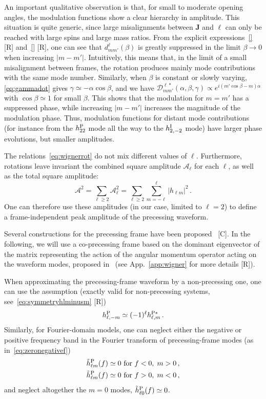 \documentclass[aps,showpacs,twocolumn,
prd,superscriptaddress,nofootinbib]{revtex4-1}
\newcommand{\be}{\begin{equation}}
\newcommand{\ee}{\end{equation}}
\newcommand\calD{{\mathcal{D}}}
\newcommand\calA{{\mathcal{A}}}
\newcommand{\nn}{\nonumber}
\newcommand{\SM}[1]{{\color{Red} #1}}
\begin{document}
An important qualitative observation is that, for small to moderate opening angles, the modulation functions show a clear hierarchy in amplitude. This situation is quite generic, since large misalignments between $\bm{J}$ and $\bm{\ell}$ can only be reached with large spins and large mass ratios. From the explicit expressions~\eqref{} \SM{[R]} and~\eqref{} \SM{[R]}, one can see that $d^{\ell}_{mm'}(\beta)$ is greatly suppressed in the limit $\beta \rightarrow 0$ when increasing $|m-m'|$. Intuitively, this means that, in the limit of a small misalignment between frames, the rotation produces mainly mode contributions with the same mode number. Similarly, when $\beta$ is constant or slowly varying, \eqref{eq:gammadot} gives $\gamma \simeq - \alpha \cos\beta$, and we have $\calD^{\ell *}_{mm'} (\alpha, \beta, \gamma) \propto e^{i(m' \cos\beta - m) \alpha}$ with $\cos\beta \simeq 1$ for small $\beta$. This shows that the modulation for $m=m'$ has a suppressed phase, while increasing $|m-m'|$ increases the magnitude of the modulation phase. Thus, modulation functions for distant mode contributions (for instance from the $h^{\rm P}_{22}$ mode all the way to the $h^{\rm I}_{2,-2}$ mode) have larger phase evolutions, but smaller amplitudes.

The relations~\eqref{eq:wignerrot} do not mix different values of $\ell$. Furthermore, rotations leave invariant the combined square amplitude $\calA_{\ell}$ for each $\ell$, as well as the total square amplitude:
\be
	\calA^{2} = \sum\limits_{\ell \geq 2}\calA_{\ell}^{2} = \sum\limits_{\ell \geq 2}\sum\limits_{m=-\ell}^{\ell} |h_{\ell m}|^{2} \,.
\ee
One can therefore use these amplitudes (in our case, limited to $\ell = 2$) to define a frame-independent peak amplitude of the precessing waveform.

Several constructions for the precessing frame have been proposed~\cite{} \SM{[C]}. In the following, we will use a co-precessing frame based on the dominant eigenvector of the matrix representing the action of the angular momentum operator acting on the waveform modes, proposed in~\cite{OShaughnessy+11} (see App.~\ref{app:wigner} for more details \SM{[R]}).

When approximating the precessing-frame waveform by a non-precessing one, one can use the assumption (exactly valid for non-precessing systems, see~\eqref{eq:symmetryhlminusm} \SM{[R]})
\be\label{eq:approxsymmetryhlminusm}
	h^{\rm P}_{\ell,-m} \simeq (-1)^{\ell} h^{\rm P*}_{\ell,m} \,.
\ee
Similarly, for Fourier-domain models, one can neglect either the negative or positive frequency band in the Fourier transform of precessing-frame modes (as in~\eqref{eq:zeronegativef})
\begin{align}\label{eq:approxzeronegativef}
	\tilde{h}_{\ell m}^{\rm P} (f) &\simeq 0 \text{ for } f<0, \; m>0 \nn\,,\\
	\tilde{h}_{\ell m}^{\rm P} (f) &\simeq 0 \text{ for } f>0, \; m<0 \,,
\end{align}
and neglect altogether the $m=0$ modes, $\tilde{h}_{\ell 0}^{\rm P} (f) \simeq 0$.
\end{document}
